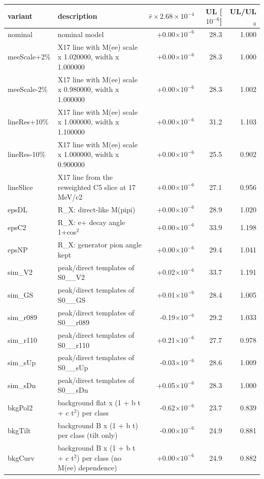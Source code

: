 \begin{tabular}{llrrr}
\toprule
variant & description & $\hat r\times2.68{\times}10^{-4}$ & UL [$10^{-6}$] & UL/UL$_0$ \\
\midrule
nominal & nominal model & +0.00$\times10^{-6}$ & 28.3 & 1.000 \\
meeScale+2\% & X17 line with M(ee) scale x 1.020000, width x 1.000000 & +0.00$\times10^{-6}$ & 28.3 & 1.000 \\
meeScale-2\% & X17 line with M(ee) scale x 0.980000, width x 1.000000 & +0.00$\times10^{-6}$ & 28.3 & 1.002 \\
lineRes+10\% & X17 line with M(ee) scale x 1.000000, width x 1.100000 & +0.00$\times10^{-6}$ & 31.2 & 1.103 \\
lineRes-10\% & X17 line with M(ee) scale x 1.000000, width x 0.900000 & +0.00$\times10^{-6}$ & 25.5 & 0.902 \\
lineSlice & X17 line from the reweighted C5 slice at 17 MeV/c2 & +0.00$\times10^{-6}$ & 27.1 & 0.956 \\
epsDL & R\_X: direct-like M(pipi) & +0.00$\times10^{-6}$ & 28.9 & 1.020 \\
epsC2 & R\_X: e+ decay angle 1+cos$^2$ & +0.00$\times10^{-6}$ & 33.9 & 1.198 \\
epsNP & R\_X: generator pion angle kept & +0.00$\times10^{-6}$ & 29.4 & 1.041 \\
sim\_V2 & peak/direct templates of S0\_\_V2 & +0.02$\times10^{-6}$ & 33.7 & 1.191 \\
sim\_GS & peak/direct templates of S0\_\_GS & +0.01$\times10^{-6}$ & 28.4 & 1.005 \\
sim\_r089 & peak/direct templates of S0\_\_r089 & -0.19$\times10^{-6}$ & 29.2 & 1.033 \\
sim\_r110 & peak/direct templates of S0\_\_r110 & +0.21$\times10^{-6}$ & 27.7 & 0.978 \\
sim\_sUp & peak/direct templates of S0\_\_sUp & -0.03$\times10^{-6}$ & 28.6 & 1.009 \\
sim\_sDn & peak/direct templates of S0\_\_sDn & +0.05$\times10^{-6}$ & 28.3 & 1.000 \\
bkgPol2 & background flat x (1 + b t + c t$^2$) per class & -0.62$\times10^{-6}$ & 23.7 & 0.839 \\
bkgTilt & background B x (1 + b t) per class (tilt only) & -0.00$\times10^{-6}$ & 24.9 & 0.881 \\
bkgCurv & background B x (1 + b t + c t$^2$) per class (no M(ee) dependence) & +0.00$\times10^{-6}$ & 24.9 & 0.882 \\

\end{tabular}
